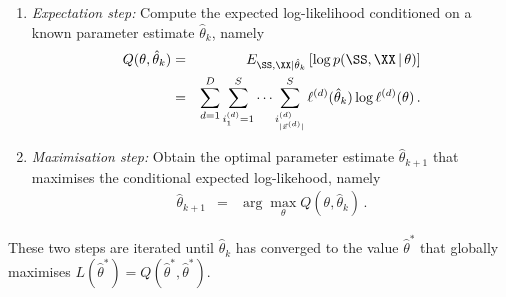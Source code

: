 \documentclass[a4paper]{article}
\begin{document}
\begin{enumerate}
\item {\em Expectation step:} Compute the expected log-likelihood conditioned on a known parameter estimate $\hat{\theta}_k$,
namely
\begin{eqnarray}
  Q(\theta,\hat{\theta}_k) & = & E_{\SS,\XX|\hat{\theta}_k}\left[\log p(\SS,\XX\,|\,\theta)\right]
\nonumber\\& = &
\sum_{d=1}^D \sum_{i_1^{(d)}=1}^{S}\cdots\sum_{i^{(d)}_{|\vec{x}^{(d)}|}}^{S} 
\ell^{(d)}(\hat{\theta}_k)\log\ell^{(d)}(\theta)\,.
\end{eqnarray}

\item {\em Maximisation step:} Obtain the optimal parameter estimate $\hat{\theta}_{k+1}$ that maximises the
conditional expected log-likehood, namely
\begin{eqnarray}
\hat{\theta}_{k+1} & = & \arg\max_{\theta} Q(\theta,\hat{\theta}_k)\,.
\end{eqnarray}
\end{enumerate}
These two steps are iterated until $\hat{\theta}_k$ has converged to the value $\hat{\theta}^*$ that globally maximises 
$L(\hat{\theta}^*)=Q(\hat{\theta}^*,\hat{\theta}^*)$.

\end{document}
